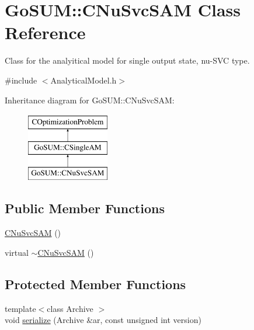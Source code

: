 \hypertarget{class_go_s_u_m_1_1_c_nu_svc_s_a_m}{\section{Go\-S\-U\-M\-:\-:C\-Nu\-Svc\-S\-A\-M Class Reference}
\label{class_go_s_u_m_1_1_c_nu_svc_s_a_m}
}


Class for the analyitical model for single output state, nu-\/\-S\-V\-C type.  




{\ttfamily \#include $<$Analytical\-Model.\-h$>$}

Inheritance diagram for Go\-S\-U\-M\-:\-:C\-Nu\-Svc\-S\-A\-M\-:\begin{figure}[H]
\begin{center}
\leavevmode
\includegraphics[height=3.000000cm]{class_go_s_u_m_1_1_c_nu_svc_s_a_m}
\end{center}
\end{figure}
\subsection*{Public Member Functions}
\begin{DoxyCompactItemize}
\item 
\hyperlink{class_go_s_u_m_1_1_c_nu_svc_s_a_m_aea0f69fa062d9a74dc15652e532a90b0}{C\-Nu\-Svc\-S\-A\-M} ()
\item 
virtual \hyperlink{class_go_s_u_m_1_1_c_nu_svc_s_a_m_ae07bab5c5cdaf561a6f28cf54153bf54}{$\sim$\-C\-Nu\-Svc\-S\-A\-M} ()
\end{DoxyCompactItemize}
\subsection*{Protected Member Functions}
\begin{DoxyCompactItemize}
\item 
{\footnotesize template$<$class Archive $>$ }\\void \hyperlink{class_go_s_u_m_1_1_c_nu_svc_s_a_m_ac2dab3b5e58ec30ac474f1614bf20873}{serialize} (Archive \&ar, const unsigned int version)
\end{DoxyCompactItemize}

